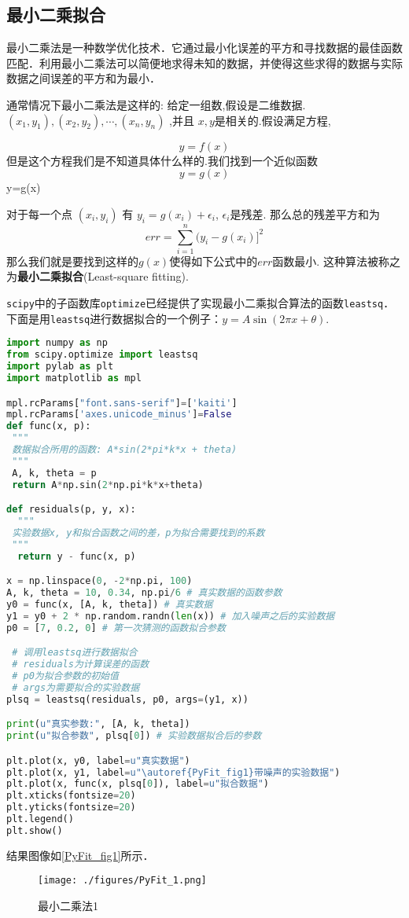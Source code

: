
\subsection{最小二乘拟合}
最小二乘法是一种数学优化技术．它通过最小化误差的平方和寻找数据的最佳函数匹配．利用最小二乘法可以简便地求得未知的数据，并使得这些求得的数据与实际数据之间误差的平方和为最小．

通常情况下最小二乘法是这样的:
给定一组数,假设是二维数据.$(x_1,y_1),(x_2,y_2),\cdots,(x_n,y_n)$ ,并且 $x,y$是相关的.假设满足方程,

\begin{equation}
y=f(x)
\end{equation}
但是这个方程我们是不知道具体什么样的.我们找到一个近似函数
\begin{equation}
y=g(x)
\end{equation}
y=g(x)

对于每一个点 $(x_i,y_i)$ 有 $y_i=g(x_i)+\epsilon_i$, $\epsilon_i$是残差. 那么总的残差平方和为
\begin{equation}
err=\sum_{i=1}^n(y_i-g(x_i)]^2
\end{equation}
那么我们就是要找到这样的$g(x)$使得如下公式中的$err$函数最小. 这种算法被称之为\textbf{最小二乘拟合}(Least-square fitting).

\verb|scipy|中的子函数库\verb|optimize|已经提供了实现最小二乘拟合算法的函数\verb|leastsq|．下面是用\verb|leastsq|进行数据拟合的一个例子：$y=A\sin(2\pi x+\theta)$.
\begin{lstlisting}[language=python]
import numpy as np
from scipy.optimize import leastsq
import pylab as plt
import matplotlib as mpl

mpl.rcParams["font.sans-serif"]=['kaiti']
mpl.rcParams['axes.unicode_minus']=False
def func(x, p):
 """
 数据拟合所用的函数: A*sin(2*pi*k*x + theta)
 """
 A, k, theta = p
 return A*np.sin(2*np.pi*k*x+theta)

def residuals(p, y, x):
  """
 实验数据x, y和拟合函数之间的差，p为拟合需要找到的系数
 """
  return y - func(x, p)

x = np.linspace(0, -2*np.pi, 100)
A, k, theta = 10, 0.34, np.pi/6 # 真实数据的函数参数
y0 = func(x, [A, k, theta]) # 真实数据
y1 = y0 + 2 * np.random.randn(len(x)) # 加入噪声之后的实验数据
p0 = [7, 0.2, 0] # 第一次猜测的函数拟合参数

 # 调用leastsq进行数据拟合
 # residuals为计算误差的函数
 # p0为拟合参数的初始值
 # args为需要拟合的实验数据
plsq = leastsq(residuals, p0, args=(y1, x))

print(u"真实参数:", [A, k, theta])
print(u"拟合参数", plsq[0]) # 实验数据拟合后的参数

plt.plot(x, y0, label=u"真实数据")
plt.plot(x, y1, label=u"\autoref{PyFit_fig1}带噪声的实验数据")
plt.plot(x, func(x, plsq[0]), label=u"拟合数据")
plt.xticks(fontsize=20)
plt.yticks(fontsize=20)
plt.legend()
plt.show()
\end{lstlisting}
结果图像如\autoref{PyFit_fig1}所示．
\begin{figure}[ht]
\centering
\texttt{[image: ./figures/PyFit\_1.png]}
\caption{最小二乘法1} \label{PyFit_fig1}
\end{figure}

